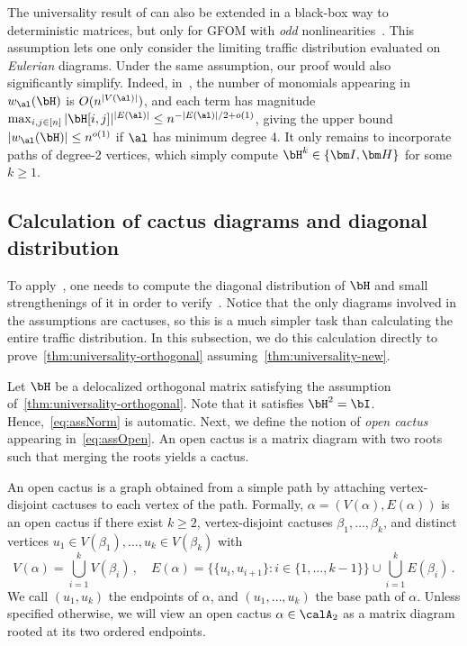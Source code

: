     The universality result of \cite{wang2022universality} can also be extended in a black-box way to
    deterministic matrices, but only for GFOM with {\em odd} nonlinearities~\cite{dudeja2023universality,
    zhong2024approximate}. 
    This assumption lets one only consider the limiting traffic distribution evaluated on {\em Eulerian} diagrams. Under the same
    assumption, our proof would also 
    significantly simplify. Indeed, in~, the number of monomials appearing in $w_\al(\bH)$ is $O(n^{|V(\al)|})$, and each term has magnitude $\max_{i,j\in [n]}|\bH[i,j]|^{|E(\al)|}\le n^{-|E(\al)|/2+o(1)}$, giving the upper bound $|w_\al(\bH)| \leq n^{o(1)}$ if $\al$ has minimum degree 4. It only remains to incorporate paths of degree-2 vertices, which simply compute $\bH^k\in \{\bm I, \bm H\}$ for some $k\ge 1$.
    
\subsection{Calculation of cactus diagrams and diagonal distribution}
\label{sec:diagonal-hadamard}

To apply~, one needs to
compute the diagonal distribution of $\bH$ and small strengthenings of it
in order to verify~.
Notice that the only diagrams involved in the assumptions are cactuses, so this is a much simpler task than calculating the entire traffic distribution.
In this subsection, we do this calculation directly to prove~\cref{thm:universality-orthogonal} assuming~\cref{thm:universality-new}.

Let $\bH$ be a delocalized orthogonal matrix
satisfying the assumption of~\cref{thm:universality-orthogonal}. Note that it
satisfies $\bH^2 = \bI$. Hence,~\cref{eq:assNorm} is automatic.
Next, we define the notion of {\em open cactus} appearing in~\cref{eq:assOpen}. An {open cactus} is
a matrix diagram with two roots such that merging the roots yields a cactus.
\begin{definition}
    \label{def:open-cactus}
    An { open cactus} is a graph obtained from
    a simple path by
    attaching vertex-disjoint cactuses to 
    each vertex of the path.
    Formally, $\alpha=(V(\alpha),E(\alpha))$
    is an open cactus if there exist $k\ge 2$,
    vertex-disjoint cactuses $\beta_1, \ldots, \beta_{k}$, and
    distinct vertices $u_1\in V(\beta_1), \ldots, u_{k}\in V(\beta_{k})$ with
    \[
        V(\alpha) = \bigcup_{i=1}^{k} V(\beta_i)\,,\quad E(\alpha) = \{\{u_i,u_{i+1}\}:i\in \{1,\ldots, k-1\}\}\cup \bigcup_{i=1}^{k} E(\beta_i)\,.
    \]
    We call $(u_1,u_{k})$ the {endpoints} of $\alpha$, and $(u_1, \ldots, u_k)$ the {base
    path} of $\alpha$.
    Unless specified otherwise, we will view
    an open cactus $\alpha\in\calA_2$ as a
    matrix diagram rooted at its two ordered endpoints.
\end{definition}

